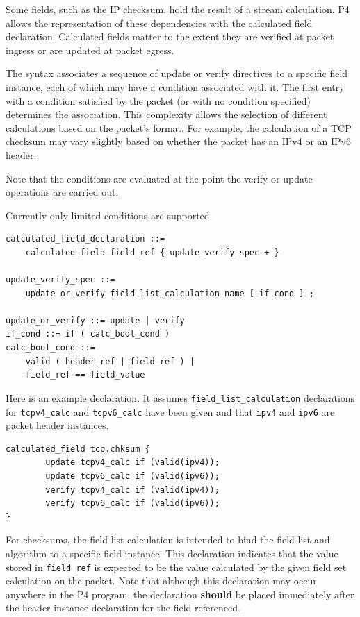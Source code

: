 \documentclass[12pt]{article}
\begin{document}

Some fields, such as the IP checksum, hold the result of a stream
calculation.  P4 allows the representation of these dependencies with
the calculated field declaration. Calculated fields matter to the
extent they are verified at packet ingress or are updated at packet
egress.

The syntax associates a sequence of update or verify directives to a
specific field instance, each of which may have a condition associated
with it. The first entry with a condition satisfied by the packet (or
with no condition specified) determines the association. This
complexity allows the selection of different calculations based on the
packet's format. For example, the calculation of a TCP checksum may
vary slightly based on whether the packet has an IPv4 or an IPv6
header.

Note that the conditions are evaluated at the point the verify or
update operations are carried out.

Currently only limited conditions are supported.

\begin{lstlisting}[style=BNFstyle]
calculated_field_declaration ::=
    calculated_field field_ref { update_verify_spec + }

update_verify_spec ::=
    update_or_verify field_list_calculation_name [ if_cond ] ;

update_or_verify ::= update | verify
if_cond ::= if ( calc_bool_cond )
calc_bool_cond ::=
    valid ( header_ref | field_ref ) |
    field_ref == field_value
\end{lstlisting}

Here is an example declaration. It assumes \texttt{field_list_calculation} declarations 
for \texttt{tcpv4_calc} and \texttt{tcpv6_calc} have been given and that \texttt{ipv4} and \texttt{ipv6} are 
packet header instances.

\begin{lstlisting}[style=P4style]
calculated_field tcp.chksum {
        update tcpv4_calc if (valid(ipv4));
        update tcpv6_calc if (valid(ipv6));
        verify tcpv4_calc if (valid(ipv4));
        verify tcpv6_calc if (valid(ipv6));
}
\end{lstlisting}

For checksums, the field list calculation is intended to bind the field list 
and algorithm to a specific field instance. This declaration indicates that 
the value stored in \texttt{field_ref} is expected to be the value calculated by the 
given field set calculation on the packet. Note that although this declaration 
may occur anywhere in the P4 program, the declaration \textbf{should} be placed immediately 
after the header instance declaration for the field referenced.
\end{document}
